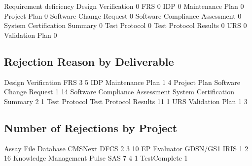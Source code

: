 \documentclass{article}
\begin{document}
\begin{Schunk}
\begin{Soutput}
                                 Requirement deficiency
  Design Verification                                 0
  FRS                                                 0
  IDP                                                 0
  Maintenance Plan                                    0
  Project Plan                                        0
  Software Change Request                             0
  Software Compliance Assessment                      0
  System Certification Summary                        0
  Test Protocol                                       0
  Test Protocol Results                               0
  URS                                                 0
  Validation Plan                                     0
\end{Soutput}
\end{Schunk}


\subsection{Rejection Reason by Deliverable}

\begin{Schunk}
\begin{Soutput}
           Design Verification                            FRS 
                             3                              5 
                           IDP               Maintenance Plan 
                             1                              4 
                  Project Plan        Software Change Request 
                             1                             14 
Software Compliance Assessment   System Certification Summary 
                             2                              1 
                 Test Protocol          Test Protocol Results 
                            11                              1 
                           URS                Validation Plan 
                             1                              3 
\end{Soutput}
\end{Schunk}

\subsection{Number of Rejections by Project}

\begin{Schunk}
\begin{Soutput}
 Assay File Database              CMSNext                 DFCS 
                   2                    3                   10 
        EP Evaluator             GDSN/GS1                 IRIS 
                   1                    2                   16 
Knowledge Management                Pulse                  SAS 
                   7                    4                    1 
        TestComplete 
                   1 
\end{Soutput}
\end{Schunk}
\end{document}

